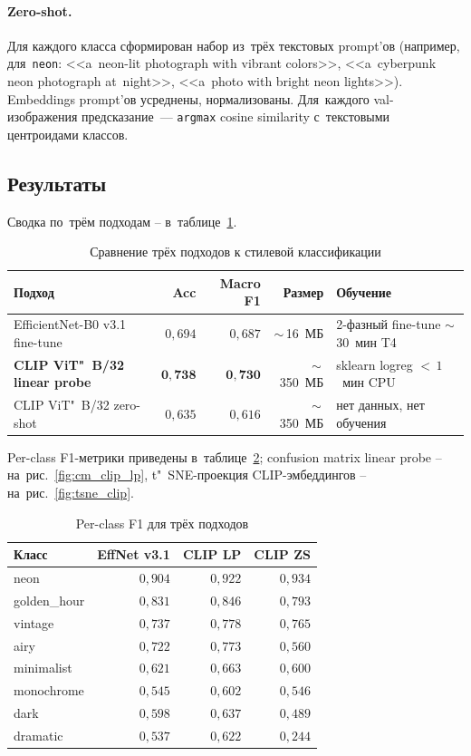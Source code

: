 \documentclass[a4paper,12pt]{diplom}
\begin{document}
\paragraph{Zero-shot.} Для каждого класса сформирован набор из~трёх текстовых prompt'ов (например, для~\texttt{neon}: <<a~neon-lit photograph with vibrant colors>>, <<a~cyberpunk neon photograph at~night>>, <<a~photo with bright neon lights>>). Embeddings prompt'ов усреднены, нормализованы. Для~каждого val-изображения предсказание~--- \texttt{argmax} cosine similarity с~текстовыми центроидами классов.

\subsection{Результаты}

Сводка по~трём подходам -- в~таблице~\ref{tab:clip}.

\begin{table}[!ht]
\caption{Сравнение трёх подходов к стилевой классификации}
\label{tab:clip}
\centering
\begin{tabular}{lrrrl}
\toprule
\textbf{Подход} & \textbf{Acc} & \textbf{Macro F1} & \textbf{Размер} & \textbf{Обучение} \\
\midrule
EfficientNet-B0 v3.1 fine-tune  & $0{,}694$ & $0{,}687$ & $\sim$\,16~МБ  & 2-фазный fine-tune $\sim$\,30~мин T4 \\
\textbf{CLIP ViT"~B/32 linear probe} & $\mathbf{0{,}738}$ & $\mathbf{0{,}730}$ & $\sim$\,350~МБ & sklearn logreg $<\,1$~мин CPU \\
CLIP ViT"~B/32 zero-shot          & $0{,}635$ & $0{,}616$ & $\sim$\,350~МБ & нет данных, нет обучения \\
\bottomrule
\end{tabular}
\end{table}

Per-class F1-метрики приведены в~таблице~\ref{tab:clip_perclass}; confusion matrix linear probe -- на~рис.~\ref{fig:cm_clip_lp}, t"~SNE-проекция CLIP-эмбеддингов -- на~рис.~\ref{fig:tsne_clip}.

\begin{table}[!ht]
\caption{Per-class F1 для трёх подходов}
\label{tab:clip_perclass}
\centering
\begin{tabular}{lrrr}
\toprule
\textbf{Класс} & \textbf{EffNet v3.1} & \textbf{CLIP LP} & \textbf{CLIP ZS} \\
\midrule
neon         & $0{,}904$ & $0{,}922$ & $0{,}934$ \\
golden\_hour & $0{,}831$ & $0{,}846$ & $0{,}793$ \\
vintage      & $0{,}737$ & $0{,}778$ & $0{,}765$ \\
airy         & $0{,}722$ & $0{,}773$ & $0{,}560$ \\
minimalist   & $0{,}621$ & $0{,}663$ & $0{,}600$ \\
monochrome   & $0{,}545$ & $0{,}602$ & $0{,}546$ \\
dark         & $0{,}598$ & $0{,}637$ & $0{,}489$ \\
dramatic     & $0{,}537$ & $0{,}622$ & $0{,}244$ \\
\bottomrule
\end{tabular}
\end{table}
\end{document}
